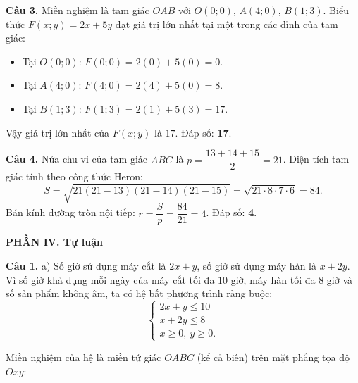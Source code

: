 \documentclass[12pt,a4paper]{article}
\begin{document}
\textbf{Câu 3.}
Miền nghiệm là tam giác $OAB$ với $O(0; 0)$, $A(4; 0)$, $B(1; 3)$. Biểu thức $F(x; y) = 2x + 5y$ đạt giá trị lớn nhất tại một trong các đỉnh của tam giác:
\begin{itemize}[leftmargin=0.5cm, itemsep=1pt, topsep=1pt]
    \item Tại $O(0; 0)$: $F(0; 0) = 2(0) + 5(0) = 0$.
    \item Tại $A(4; 0)$: $F(4; 0) = 2(4) + 5(0) = 8$.
    \item Tại $B(1; 3)$: $F(1; 3) = 2(1) + 5(3) = 17$.
\end{itemize}
Vậy giá trị lớn nhất của $F(x; y)$ là $17$. Đáp số: \textbf{17}.

\textbf{Câu 4.}
Nửa chu vi của tam giác $ABC$ là $p = \dfrac{13 + 14 + 15}{2} = 21$.
Diện tích tam giác tính theo công thức Heron:
\[
S = \sqrt{21(21-13)(21-14)(21-15)} = \sqrt{21 \cdot 8 \cdot 7 \cdot 6} = 84.
\]
Bán kính đường tròn nội tiếp: $r = \dfrac{S}{p} = \dfrac{84}{21} = 4$. Đáp số: \textbf{4}.

\vspace{0.15cm}
\textbf{\large PHẦN IV. Tự luận}

\textbf{Câu 1.}
a) Số giờ sử dụng máy cắt là $2x + y$, số giờ sử dụng máy hàn là $x + 2y$.
Vì số giờ khả dụng mỗi ngày của máy cắt tối đa $10$ giờ, máy hàn tối đa $8$ giờ và số sản phẩm không âm, ta có hệ bất phương trình ràng buộc:
\[
\begin{cases}
2x + y \le 10 \\
x + 2y \le 8 \\
x \ge 0,\ y \ge 0.
\end{cases}
\]

Miền nghiệm của hệ là miền tứ giác $OABC$ (kể cả biên) trên mặt phẳng tọa độ $Oxy$:
\end{document}
